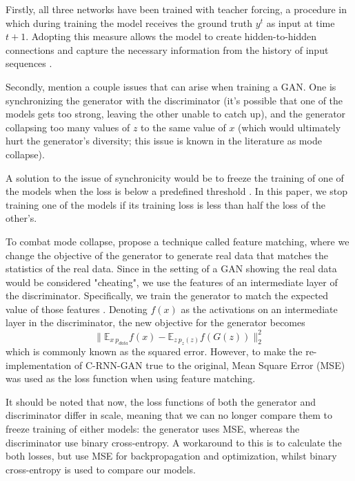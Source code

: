 \documentclass[a4paper]{book}
\begin{document}
Firstly, all three networks have been trained with teacher forcing, a procedure in which during training the model receives the ground truth $y^t$ as input at time $t+1$. Adopting this measure allows the model to create hidden-to-hidden connections and capture the necessary information from the history of input sequences \parencite{goodfellow_deep_2016}.

Secondly, \textcite{goodfellow_generative_2014} mention a couple issues that can arise when training a GAN. One is synchronizing the generator with the discriminator (it's possible that one of the models gets too strong, leaving the other unable to catch up), and the generator collapsing too many values of $z$ to the same value of $x$ (which would ultimately hurt the generator's diversity; this issue is known in the literature as mode collapse).

A solution to the issue of synchronicity would be to freeze the training of one of the models when the loss is below a predefined threshold \parencite{mogren_c-rnn-gan_2016}. In this paper, we stop training one of the models if its training loss is less than half the loss of the other's.

To combat mode collapse, \textcite{salimans_improved_2016} propose a technique called feature matching, where we change the objective of the generator to generate real data that matches the statistics of the real data. Since in the setting of a GAN showing the real data would be considered "cheating", we use the features of an intermediate layer of the discriminator. Specifically, we train the generator to match the expected value of those features \parencite{salimans_improved_2016}. Denoting $f(x)$ as the activations on an intermediate layer in the discriminator, the new objective for the generator becomes
\begin{equation}
    \|\mathbb{E}_{x~p_{data}} f(x) - \mathbb{E}_{z~p_z (z)} f(G(z))\|_2^2
\end{equation}
which is commonly known as the squared error. However, to make the re-implementation of C-RNN-GAN true to the original, Mean Square Error (MSE) was used as the loss function when using feature matching.

It should be noted that now, the loss functions of both the generator and discriminator differ in scale, meaning that we can no longer compare them to freeze training of either models: the generator uses MSE, whereas the discriminator use binary cross-entropy. A workaround to this is to calculate the both losses, but use MSE for backpropagation and optimization, whilst binary cross-entropy is used to compare our models.
\end{document}
